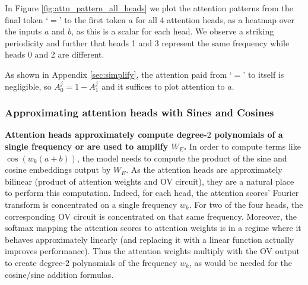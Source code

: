 \documentclass{article} %
\newcommand{\cosp}[1]{\cos \left ( #1 \right )}
\begin{document}
In Figure \ref{fig:attn_pattern_all_heads} we plot the attention patterns from the final token `$=$' to the first token $a$ for all 4 attention heads, as a heatmap over the inputs $a$ and $b$, as this is a scalar for each head. We observe a striking periodicity and further that heads 1 and 3 represent the same frequency while heads 0 and 2 are different. 

As shown in Appendix \ref{sec:simplify}, the attention paid from `$=$' to itself is negligible, so $A^j_0=1-A^j_1$ and it suffices to plot attention to $a$. 
\subsubsection{Approximating attention heads with Sines and Cosines}
\label{sec:4.3-replacement}

\textbf{Attention heads approximately compute degree-$2$ polynomials of a single frequency or are used to amplify $W_E$.} In order to compute terms like $\cosp{w_k (a+b)}$, the model needs to compute the product of the sine and cosine embeddings output by $W_E$. As the attention heads are approximately bilinear (product of attention weights and OV circuit), they are a natural place to perform this computation.  Indeed, for each head, the attention scores' Fourier transform is concentrated on a single frequency $w_k$. For two of the four heads, the corresponding OV circuit is concentrated on that same frequency. Moreover, the softmax mapping the attention scores to attention weights is in a regime where it behaves approximately linearly (and replacing it with a linear function actually improves performance). Thus the attention weights multiply with the OV output to create degree-$2$ polynomials of the frequency $w_k$, as would be needed for the cosine/sine addition formulas.
\end{document}
